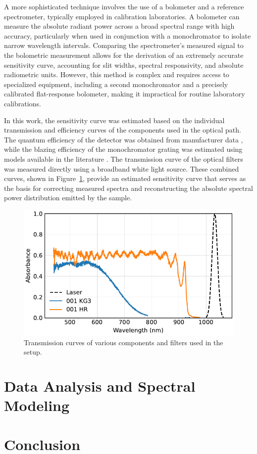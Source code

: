 \documentclass[
	parskip=half,
	a4paper,
]{scrarticle}
\begin{document}
A more sophisticated technique involves the use of a bolometer and a reference spectrometer, typically employed in calibration laboratories. A bolometer can measure the absolute radiant power across a broad spectral range with high accuracy, particularly when used in conjunction with a monochromator to isolate narrow wavelength intervals. Comparing the spectrometer's measured signal to the bolometric measurement allows for the derivation of an extremely accurate sensitivity curve, accounting for slit widths, spectral responsivity, and absolute radiometric units. However, this method is complex and requires access to specialized equipment, including a second monochromator and a precisely calibrated flat-response bolometer, making it impractical for routine laboratory calibrations.

In this work, the sensitivity curve was estimated based on the individual transmission and efficiency curves of the components used in the optical path. The quantum efficiency of the detector was obtained from manufacturer data \cite{andor_ixonem_nodate}, while the blazing efficiency of the monochromator grating was estimated using models available in the literature \cite{barker_ripple_1984}. The transmission curve of the optical filters was measured directly using a broadband white light source. These combined curves, shown in Figure~\ref{fig:transmission}, provide an estimated sensitivity curve that serves as the basis for correcting measured spectra and reconstructing the absolute spectral power distribution emitted by the sample.

\begin{figure}
    \centering
    \includegraphics{../analysis/figures/filter.pdf}
    \caption{Transmission curves of various components and filters used in the setup.}
    \label{fig:transmission}
\end{figure}


\section{Data Analysis and Spectral Modeling}


\section{Conclusion}

\clearpage
\printbibliography
\end{document}
